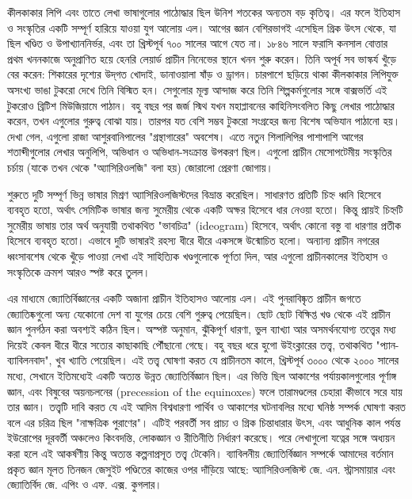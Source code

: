 কীলকাকার লিপি এবং তাতে লেখা ভাষাগুলোর পাঠোদ্ধার ছিল উনিশ শতকের অন্যতম বড় কৃতিত্ব। এর ফলে ইতিহাস ও সংস্কৃতির একটি সম্পূর্ণ হারিয়ে যাওয়া যুগ আলোয় এল। আগের জ্ঞান বেশিরভাগই এসেছিল গ্রিক উৎস থেকে, যা ছিল খণ্ডিত ও উপাখ্যাননির্ভর, এবং তা খ্রিস্টপূর্ব ৭০০ সালের আগে যেত না। ১৮৪৬ সালে ফরাসি কনসাল বোত্তার প্রথম খননকাজে অনুপ্রাণিত হয়ে হেনরি লেয়ার্ড প্রাচীন নিনেভের স্থানে খনন শুরু করেন। তিনি অপূর্ব সব ভাস্কর্য খুঁড়ে বের করেন: শিকারের দৃশ্যের উদ্‌গত খোদাই, ডানাওয়ালা ষাঁড় ও ড্রাগন। চারপাশে ছড়িয়ে থাকা কীলকাকার লিপিযুক্ত অসংখ্য ভাঙা টুকরো দেখে তিনি বিস্মিত হন। সেগুলোর মূল্য আন্দাজ করে তিনি শিল্পকর্মগুলোর সঙ্গে বাক্সভর্তি এই টুকরোও ব্রিটিশ মিউজিয়ামে পাঠান। বহু বছর পর জর্জ স্মিথ যখন মহাপ্লাবনের কাহিনিসংবলিত কিছু লেখার পাঠোদ্ধার করেন, তখন এগুলোর গুরুত্ব বোঝা যায়। তারপর যত বেশি সম্ভব টুকরো সংগ্রহের জন্য বিশেষ অভিযান পাঠানো হয়। দেখা গেল, এগুলো রাজা আশুরবানিপালের "গ্রন্থাগারের" অবশেষ। এতে নতুন শিলালিপির পাশাপাশি আগের শতাব্দীগুলোর লেখার অনুলিপি, অভিধান ও অভিধান-সংক্রান্ত উপকরণ ছিল। এগুলো প্রাচীন মেসোপটেমীয় সংস্কৃতির চর্চায় (যাকে তখন থেকে "অ্যাসিরিওলজি" বলা হয়) জোরালো প্রেরণা জোগায়।

শুরুতে দুটি সম্পূর্ণ ভিন্ন ভাষার মিশ্রণ অ্যাসিরিওলজিস্টদের বিভ্রান্ত করেছিল। সাধারণত প্রতিটি চিহ্ন ধ্বনি হিসেবে ব্যবহৃত হতো, অর্থাৎ সেমিটিক ভাষার জন্য সুমেরীয় থেকে একটি অক্ষর হিসেবে ধার নেওয়া হতো। কিন্তু প্রায়ই চিহ্নটি সুমেরীয় ভাষায় তার অর্থ অনুযায়ী তথাকথিত "ভাবচিত্র" (ideogram) হিসেবে, অর্থাৎ কোনো বস্তু বা ধারণার প্রতীক হিসেবে ব্যবহৃত হতো। এভাবে দুটি ভাষারই রহস্য ধীরে ধীরে একসঙ্গে উন্মোচিত হলো। অন্যান্য প্রাচীন নগরের ধ্বংসাবশেষ থেকে খুঁড়ে পাওয়া লেখা এই সাহিত্যিক খণ্ডগুলোকে পূর্ণতা দিল, আর এগুলো প্রাচীনকালের ইতিহাস ও সংস্কৃতিকে ক্রমশ আরও স্পষ্ট করে তুলল।

এর মাধ্যমে জ্যোতির্বিজ্ঞানের একটি অজানা প্রাচীন ইতিহাসও আলোয় এল। এই পুনরাবিষ্কৃত প্রাচীন জগতে জ্যোতিষ্কগুলো অন্য যেকোনো দেশ বা যুগের চেয়ে বেশি গুরুত্ব পেয়েছিল। ছোট ছোট বিক্ষিপ্ত খণ্ড থেকে এই প্রাচীন জ্ঞান পুনর্গঠন করা অবশ্যই কঠিন ছিল। অস্পষ্ট অনুমান, ঝুঁকিপূর্ণ ধারণা, ভুল ব্যাখ্যা আর অসমর্থনযোগ্য তত্ত্বের মধ্য দিয়েই কেবল ধীরে ধীরে সত্যের কাছাকাছি পৌঁছানো গেছে। বহু বছর ধরে হুগো উইংক্লারের তত্ত্ব, তথাকথিত "প্যান-ব্যাবিলনবাদ", খুব খ্যাতি পেয়েছিল। এই তত্ত্ব ঘোষণা করত যে প্রাচীনতম কালে, খ্রিস্টপূর্ব ৩০০০ থেকে ২০০০ সালের মধ্যে, সেখানে ইতিমধ্যেই একটি অত্যন্ত উন্নত জ্যোতির্বিজ্ঞান ছিল। এর ভিত্তি ছিল আকাশের পর্যায়কালগুলোর পূর্ণাঙ্গ জ্ঞান, এবং বিষুবের অয়নচলনের (precession of the equinoxes) ফলে তারামণ্ডলের চেহারা কীভাবে সরে যায় তার জ্ঞান। তত্ত্বটি দাবি করত যে এই আদিম বিশ্বধারণা পার্থিব ও আকাশের ঘটনাবলির মধ্যে ঘনিষ্ঠ সম্পর্ক ঘোষণা করত বলে এর চরিত্র ছিল "নাক্ষত্রিক পুরাণের"। এটিই পরবর্তী সব প্রাচ্য ও গ্রিক চিন্তাধারার উৎস, এবং আধুনিক কাল পর্যন্ত ইউরোপের দূরবর্তী অঞ্চলেও কিংবদন্তি, লোকজ্ঞান ও রীতিনীতি নির্ধারণ করেছে। পরে লেখাগুলো যত্নের সঙ্গে অধ্যয়ন করা হলে এই আকর্ষণীয় কিন্তু অত্যন্ত কল্পনাপ্রসূত তত্ত্ব টেকেনি। ব্যাবিলনীয় জ্যোতির্বিজ্ঞান সম্পর্কে আমাদের বর্তমান প্রকৃত জ্ঞান মূলত তিনজন জেসুইট পণ্ডিতের কাজের ওপর দাঁড়িয়ে আছে: অ্যাসিরিওলজিস্ট জে. এন. স্ট্রাসমায়ার এবং জ্যোতির্বিদ জে. এপিং ও এফ. এক্স. কুগলার।

